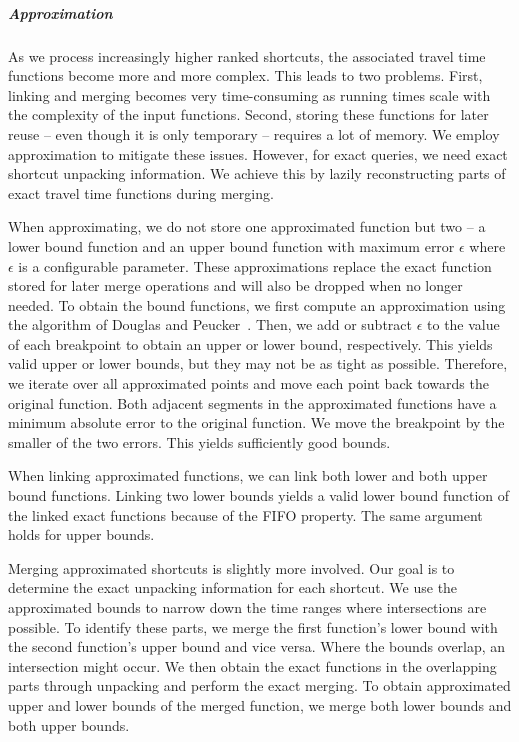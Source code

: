 \documentclass[a4paper,UKenglish,cleveref,autoref]{lipics-v2019}
\begin{document}
\subparagraph*{Approximation}

As we process increasingly higher ranked shortcuts, the associated travel time functions become more and more complex.
This leads to two problems.
First, linking and merging becomes very time-consuming as running times scale with the complexity of the input functions.
Second, storing these functions for later reuse -- even though it is only temporary -- requires a lot of memory.
We employ approximation to mitigate these issues.
However, for exact queries, we need exact shortcut unpacking information.
We achieve this by lazily reconstructing parts of exact travel time functions during merging.

When approximating, we do not store one approximated function but two -- a lower bound function and an upper bound function with maximum error $\epsilon$ where $\epsilon$ is a configurable parameter.
These approximations replace the exact function stored for later merge operations and will also be dropped when no longer needed.
To obtain the bound functions, we first compute an approximation using the algorithm of Douglas and Peucker~\cite{dp-arnpr-73}.
Then, we add or subtract $\epsilon$ to the value of each breakpoint to obtain an upper or lower bound, respectively.
This yields valid upper or lower bounds, but they may not be as tight as possible.
Therefore, we iterate over all approximated points and move each point back towards the original function.
Both adjacent segments in the approximated functions have a minimum absolute error to the original function.
We move the breakpoint by the smaller of the two errors.
This yields sufficiently good bounds.

When linking approximated functions, we can link both lower and both upper bound functions.
Linking two lower bounds yields a valid lower bound function of the linked exact functions because of the FIFO property.
The same argument holds for upper bounds.

Merging approximated shortcuts is slightly more involved.
Our goal is to determine the exact unpacking information for each shortcut.
We use the approximated bounds to narrow down the time ranges where intersections are possible.
To identify these parts, we merge the first function's lower bound with the second function's upper bound and vice versa.
Where the bounds overlap, an intersection might occur.
We then obtain the exact functions in the overlapping parts through unpacking and perform the exact merging.
To obtain approximated upper and lower bounds of the merged function, we merge both lower bounds and both upper bounds.
\end{document}
